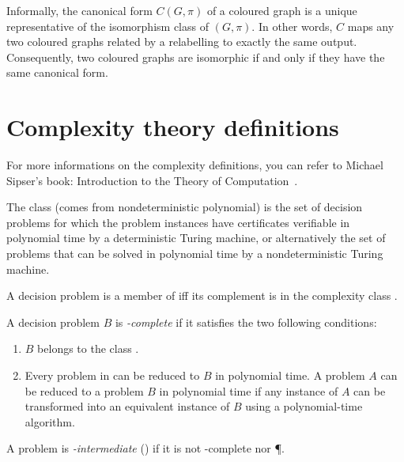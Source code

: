 Informally, the canonical form $C(G,\pi)$ of a coloured graph is a unique representative of the isomorphism class of $(G,\pi)$. In other words, $C$ maps any two 
coloured graphs related by a relabelling to exactly the same output. Consequently, two coloured graphs are isomorphic if and only if they have the same canonical form.

\section{Complexity theory definitions}

For more informations on the complexity definitions, you can refer to  Michael Sipser's book: Introduction to the Theory of Computation~\cite{sipser1996introduction}.

\vspace{1em}

\begin{definition}[minimalist]\label{def:NP}
The class \emph{\NP} (comes from nondeterministic polynomial) is the set of decision problems for which the problem instances have certificates verifiable in polynomial time by a deterministic Turing machine, or alternatively the set of problems that can be solved in polynomial time by a nondeterministic Turing machine.

A decision problem  is a member of \coNP{} iff its complement is in the complexity class \NP.

A decision problem $B$ is \emph{\NP-complete} if it satisfies the two following conditions:
\begin{enumerate}
    \item $B$ belongs to the class \NP{}.
    \item Every problem in \NP{} can be reduced to $B$ in polynomial time. A problem $A$ can be reduced to a problem $B$ in polynomial time if any instance of $A$ can be transformed into an equivalent instance of $B$ using a polynomial-time algorithm.
\end{enumerate}
\end{definition}

\vspace{1em}

\begin{definition}
A problem is \emph{\NP-intermediate} (\NPI) if it is not \NP{}-complete nor \P. 
\end{definition}

\vspace{1em}

